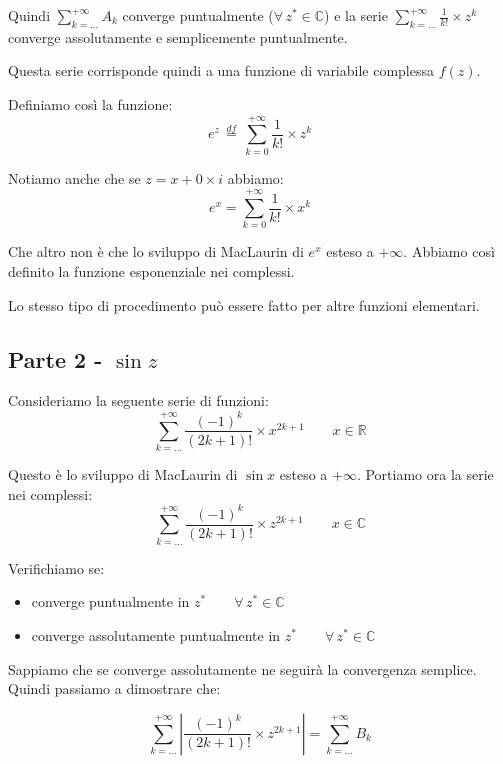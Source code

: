 \documentclass[../../analisi1]{subfiles}
\begin{document}
                Quindi \(\sum_{k=\dots}^{+\infty} A_k\) converge puntualmente (\(\forall \, z^* \in \mathbb{C}\)) 
                e la serie  \(\sum_{k=\dots}^{+\infty} \frac{1}{k!} \times z^k \) converge assolutamente e semplicemente puntualmente.

                Questa serie corrisponde quindi a una funzione di variabile complessa \(f(z)\).

                Definiamo così la funzione:
                \[  e^z \, \stackrel{df}{=} \, \sum_{k=0}^{+\infty} \frac{1}{k!} \times z^k    \]

                Notiamo anche che se \(z = x + 0 \times i\) abbiamo:
                \[  e^x = \sum_{k=0}^{+\infty} \frac{1}{k!} \times x^k \]

                Che altro non è che lo sviluppo di MacLaurin di \(e^x\) esteso a \(+\infty\). 
                Abbiamo così definito la funzione esponenziale nei complessi.

            Lo stesso tipo di procedimento può essere fatto per altre funzioni elementari.
            
            \subsection*{Parte 2 - \(\sin z\)}

                Consideriamo la seguente serie di funzioni:
                \[  \sum_{k=\dots}^{+\infty} \frac{(-1)^k}{(2k+1)!} \times x^{2k+1} \qquad x \in \mathbb{R}  \]

                Questo è lo sviluppo di MacLaurin di \(\sin x\) esteso a \(+ \infty\). Portiamo ora la serie nei complessi:
                \[  \sum_{k=\dots}^{+\infty} \frac{(-1)^k}{(2k+1)!} \times z^{2k+1} \qquad x \in \mathbb{C}  \]

                Verifichiamo se:
                \begin{itemize}
                    \item converge puntualmente in \(z^* \qquad \forall \, z^*  \in \mathbb{C}\)
                    \item converge assolutamente puntualmente in \(z^* \qquad \forall \, z^*  \in \mathbb{C}\)
                \end{itemize}
            
                Sappiamo che se converge assolutamente ne seguirà la convergenza semplice. Quindi passiamo a dimostrare che:

                \[  \sum_{k=\dots}^{+\infty} \left| \frac{(-1)^k}{(2k+1)!} \times z^{2k+1} \right| = \sum_{k=\dots}^{+\infty} B_k \]
\end{document}
